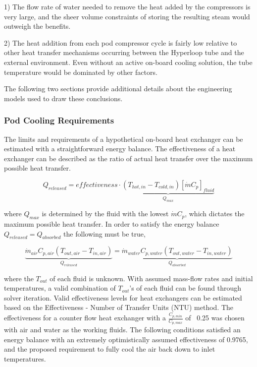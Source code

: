 \documentclass[heading.tex]{subfiles}
\begin{document}
1) The flow rate of water needed to remove the heat added by the compressors is very large,
and the sheer volume constraints of storing the resulting steam would outweigh the benefits.

2) The heat addition from each pod compressor cycle is fairly low relative to other heat transfer mechanisms
occurring between the Hyperloop tube and the external environment.
Even without an active on-board cooling solution, the tube temperature would be dominated by other factors.

The following two sections provide additional details about the engineering models used to draw these conclusions.

\subsubsection{Pod Cooling Requirements}

The limits and requirements of a hypothetical on-board heat exchanger can be estimated with a straightforward energy balance. The
effectiveness of a heat exchanger can be described as the ratio of actual heat transfer over the maximum possible heat transfer.

\begin{equation}
{Q}_{released}  = effectiveness \cdot \underbrace{\left(T_{hot,in} - T_{cold,in}\right) [ \dot{m} C_{p} ]_{fluid}}_\text{${Q}_{max}$}
\end{equation}


where ${Q}_{max}$ is determined by the fluid with the lowest $\dot{m} C_{p}$, which dictates the maximum possible heat transfer.
In order to satisfy the energy balance $Q_{released}=Q_{absorbed}$ the following must be true,

\begin{equation}
\underbrace{\dot{m}_{air} C_{p, air} (T_{out, air} - T_{in, air})}_{{Q}_{released}}  = \underbrace{\dot{m}_{water} C_{p,water} (T_{out, water} - T_{in, water})}_{{Q}_{absorbed}}
\end{equation}

where the $T_{out}$  of each fluid is unknown. With assumed mass-flow rates and initial temperatures, a valid combination of $T_{out}$'s of
each fluid can be found through solver iteration. Valid effectiveness levels for heat exchangers can be estimated based on the
Effectiveness - Number of Transfer Units (NTU) method. 
The effectiveness for a counter flow heat exchanger with a $\frac{C_{p,min}}{C_{p,max}}$ of ~0.25 was chosen with air and water as the working fluids. 
The following conditions satisfied an energy balance with an extremely optimistically assumed effectiveness of 0.9765,
and the proposed requirement to fully cool the air back down to inlet temperatures.
\end{document}
